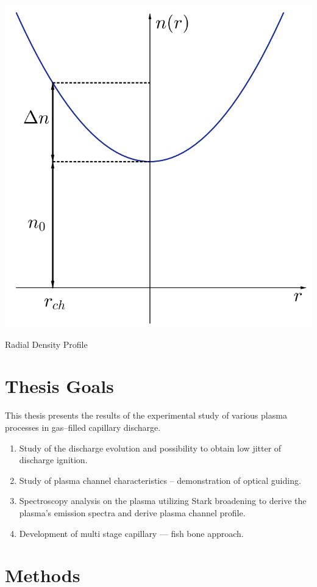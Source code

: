 \documentclass[justified,nofonts,nobib,openany]{tufte-book}
\begin{document}
\begin{marginfigure}
    \includegraphics[width=\marginparwidth]{figures/rdp.PNG}
    \caption{Radial Density Profile}
    \label{fig:rdp_parabola}
\end{marginfigure}


\chapter{Thesis Goals}\label{chap:goals}
This thesis presents the results of the experimental study of various plasma processes in gas--filled capillary discharge.
\begin{enumerate}
  \item Study of the discharge evolution and possibility to obtain low jitter of discharge ignition.
  \item Study of plasma channel characteristics -- demonstration of optical guiding.
  \item Spectroscopy analysis on the plasma utilizing Stark broadening to derive the plasma's emission spectra and derive plasma channel profile.
  \item Development of multi stage capillary --- fish bone approach.
\end{enumerate}
	\chapter{Methods}\label{chap:methods}
\end{document}
